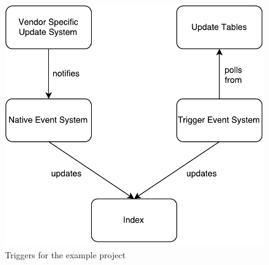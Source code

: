 \begin{figure}[ht]
	\centering
	\includegraphics[scale=0.6]{images/UpdateConsumer_Architecture.pdf}
	\caption{Triggers for the example project}
	\label{updateconsumer_architecture}
\end{figure}

\pagebreak